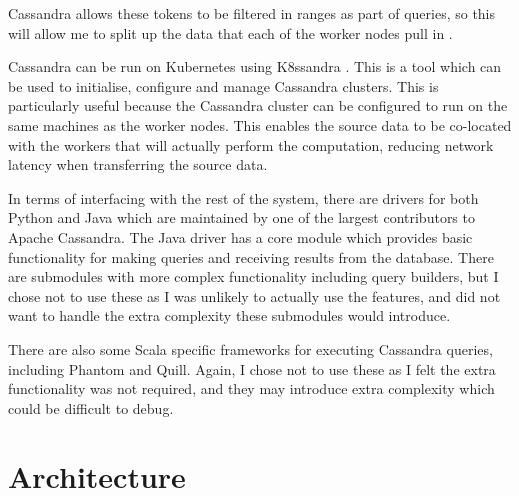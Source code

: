 
Cassandra allows these tokens to be filtered in ranges as part of queries, so this will allow me to split up the data that each of the worker nodes pull in .

Cassandra can be run on Kubernetes using K8ssandra \cite{k8ssandra}. This is a tool which can be used to initialise, configure and manage Cassandra clusters. This is particularly useful because the Cassandra cluster can be configured to run on the same machines as the worker nodes. This enables the source data to be co-located with the workers that will actually perform the computation, reducing network latency when transferring the source data.

In terms of interfacing with the rest of the system, there are drivers for both Python %
and Java %
which are maintained by one of the largest contributors to Apache Cassandra. The Java driver has a core module which provides basic functionality for making queries and receiving results from the database. There are submodules with more complex functionality including query builders, but I chose not to use these as I was unlikely to actually use the features, and did not want to handle the extra complexity these submodules would introduce.

There are also some Scala specific frameworks for executing Cassandra queries, including Phantom %
and Quill. %
Again, I chose not to use these as I felt the extra functionality was not required, and they may introduce extra complexity which could be difficult to debug.


\section{Architecture}

